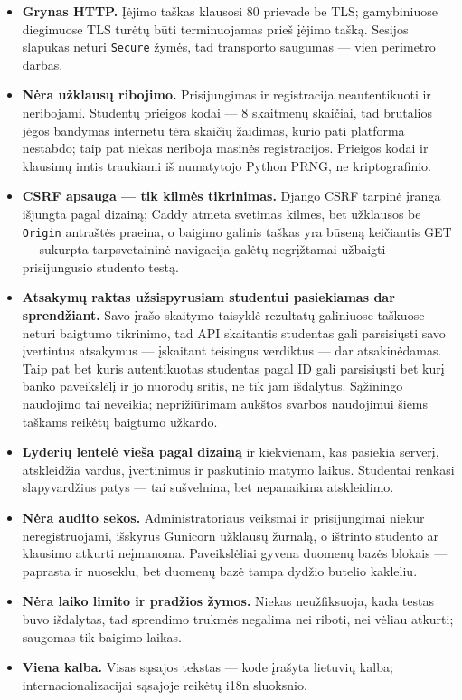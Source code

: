 \documentclass[11pt,a4paper]{article}
\newcommand{\code}[1]{\texttt{#1}}
\begin{document}
\begin{itemize}
  \item \textbf{Grynas HTTP.} Įėjimo taškas klausosi 80 prievade be
        TLS; gamybiniuose diegimuose TLS turėtų būti terminuojamas
        prieš įėjimo tašką. Sesijos slapukas neturi \code{Secure}
        žymės, tad transporto saugumas — vien perimetro darbas.
  \item \textbf{Nėra užklausų ribojimo.} Prisijungimas ir
        registracija neautentikuoti ir neribojami. Studentų prieigos
        kodai — 8 skaitmenų skaičiai, tad brutalios jėgos bandymas
        internetu tėra skaičių žaidimas, kurio pati platforma
        nestabdo; taip pat niekas neriboja masinės registracijos.
        Prieigos kodai ir klausimų imtis traukiami iš numatytojo
        Python PRNG, ne kriptografinio.
  \item \textbf{CSRF apsauga — tik kilmės tikrinimas.} Django CSRF
        tarpinė įranga išjungta pagal dizainą; Caddy atmeta svetimas
        kilmes, bet užklausos be \code{Origin} antraštės praeina, o
        baigimo galinis taškas yra būseną keičiantis GET — sukurpta
        tarpsvetaininė navigacija galėtų negrįžtamai užbaigti
        prisijungusio studento testą.
  \item \textbf{Atsakymų raktas užsispyrusiam studentui pasiekiamas
        dar sprendžiant.} Savo įrašo skaitymo taisyklė rezultatų
        galiniuose taškuose neturi baigtumo tikrinimo, tad API
        skaitantis studentas gali parsisiųsti savo įvertintus
        atsakymus — įskaitant teisingus verdiktus — dar
        atsakinėdamas. Taip pat bet kuris autentikuotas studentas
        pagal ID gali parsisiųsti bet kurį banko paveikslėlį ir jo
        nuorodų sritis, ne tik jam išdalytus. Sąžiningo naudojimo tai
        neveikia; neprižiūrimam aukštos svarbos naudojimui šiems
        taškams reikėtų baigtumo užkardo.
  \item \textbf{Lyderių lentelė vieša pagal dizainą} ir kiekvienam,
        kas pasiekia serverį, atskleidžia vardus, įvertinimus ir
        paskutinio matymo laikus. Studentai renkasi slapyvardžius
        patys — tai sušvelnina, bet nepanaikina atskleidimo.
  \item \textbf{Nėra audito sekos.} Administratoriaus veiksmai ir
        prisijungimai niekur neregistruojami, išskyrus Gunicorn
        užklausų žurnalą, o ištrinto studento ar klausimo atkurti
        neįmanoma. Paveikslėliai gyvena duomenų bazės blokais —
        paprasta ir nuoseklu, bet duomenų bazė tampa dydžio butelio
        kakleliu.
  \item \textbf{Nėra laiko limito ir pradžios žymos.} Niekas
        neužfiksuoja, kada testas buvo išdalytas, tad sprendimo
        trukmės negalima nei riboti, nei vėliau atkurti; saugomas tik
        baigimo laikas.
  \item \textbf{Viena kalba.} Visas sąsajos tekstas — kode įrašyta
        lietuvių kalba; internacionalizacijai sąsajoje reikėtų i18n
        sluoksnio.
\end{itemize}
\end{document}
